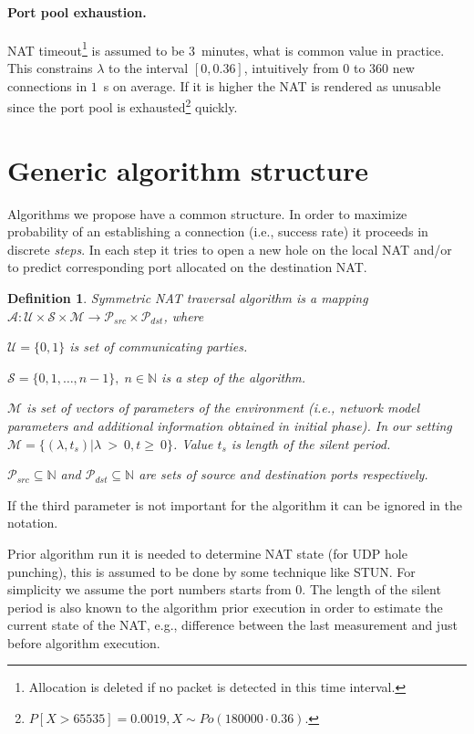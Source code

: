 \documentclass[twoside]{article}
\newtheorem{mydef}{Definition}
\begin{document}
\begin{multicols}{2}
\paragraph{Port pool exhaustion.} NAT timeout\footnote{Allocation is deleted if no packet is detected in this time interval.} is assumed to be 3~minutes, 
what is common value in practice. This constrains $\lambda$ to the interval $[0, 0.36]$, intuitively from $0$ to $360$ new connections in $1$~s on average. 
If it is higher the NAT is rendered as unusable since the port pool is exhausted\footnote{$P[X > 65535] = 0.0019, X \sim Po(180000 \cdot 0.36)$.} quickly.

\section{Generic algorithm structure}
Algorithms we propose have a common structure. In order to maximize probability of an establishing
a connection (i.e., success rate) it proceeds in discrete \emph{steps}. In each step it 
tries to open a new hole on the local NAT and/or to predict corresponding port allocated on the destination
NAT.

\begin{mydef}
Symmetric NAT traversal algorithm is a mapping 
$\mathcal{A}: \mathcal{U} \times \mathcal{S} \times \mathcal{M} \rightarrow \mathcal{P}_{src} \times \mathcal{P}_{dst}$, 
where \\
\begin{compactitem}
\item $\mathcal{U}=\{0,1\}$ is set of communicating parties.
\item $\mathcal{S} = \{0, 1, \dots, n-1\}, \; n \in \mathbb{N}$ is a step of the algorithm.
\item $\mathcal{M}$ is set of vectors of parameters of the environment (i.e., network model 
parameters and additional information obtained in initial phase). 
In our setting $\mathcal{M} = \{ (\lambda, t_s) | \lambda~>~0, t\geq~0 \}$. Value $t_s$ is length of the silent period. %
\item $\mathcal{P}_{src} \subseteq \mathbb{N}$ and $\mathcal{P}_{dst} \subseteq \mathbb{N}$
are sets of source and destination ports respectively.
\end{compactitem}
\end{mydef}
If the third parameter is not important for the algorithm it can be ignored in the notation. 

Prior algorithm run it is needed to 
determine NAT state (for UDP hole punching), this is assumed to be done by some technique like STUN. For simplicity we assume the port numbers
starts from $0$. The length of the silent period is also known to the algorithm prior execution in order to estimate the current state of 
the NAT, e.g., difference between the last measurement and just before algorithm execution.


\end{multicols}
\end{document}
